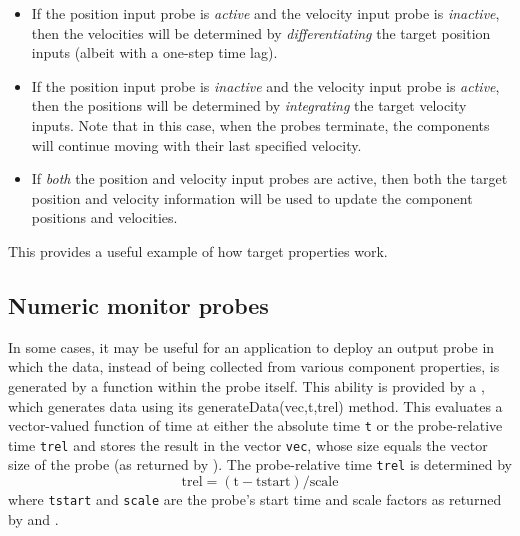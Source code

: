 \begin{itemize}
\begin{itemize}

\item If the position input probe is {\it active} and the velocity input probe
is {\it inactive}, then the velocities will be determined by {\it
differentiating} the target position inputs (albeit with a one-step time lag).

\item If the position input probe is {\it inactive} and the velocity input probe
is {\it active}, then the positions will be determined by {\it integrating} the
target velocity inputs. Note that in this case, when the probes terminate, the
components will continue moving with their last specified velocity.

\item If {\it both} the position and velocity input probes are active,
then both the target position and velocity information will be used to update
the component positions and velocities.
	
\end{itemize}

This provides a useful example of how target properties work.

\end{itemize}

\subsection{Numeric monitor probes}
\label{NumericMonitorProbes:sec}

In some cases, it may be useful for an application to deploy an output probe in
which the data, instead of being collected from various component properties,
is generated by a function within the probe itself. This ability is provided by
a
, which generates
data using its  %
{generateData(vec,t,trel)}
method. This evaluates a vector-valued function of time at
either the absolute time {\tt t} or the probe-relative time {\tt trel}
and stores the result in the vector {\tt vec}, whose size equals the
vector size of the probe (as returned by
).  The
probe-relative time {\tt trel} is determined by
%
\begin{equation}
\text{trel} = (\text{t} - \text{tstart})/\text{scale}
\end{equation}
%
where {\tt tstart} and {\tt scale} are the probe's start time
and scale factors as returned by
 and
.

